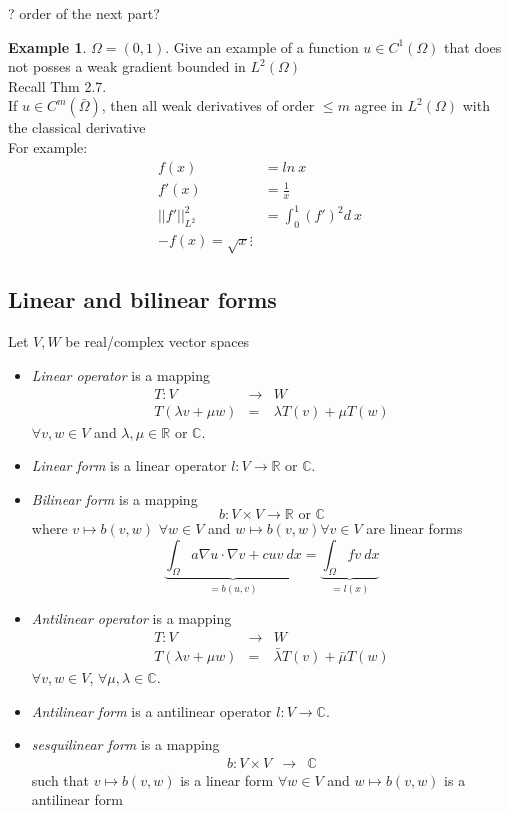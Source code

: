 \documentclass[english]{article}
\theoremstyle{definition}
\newtheorem*{exa}{Example}
\theoremstyle{remark}
\newcommand{\f}[2]{\frac{#1}{#2}}							%
\newcommand{\OO}{\Omega}
\begin{document}
? order of the next part?
\begin{exa} 
  $\OO= (0,1).$ Give an example of a function $u \in C^1(\OO)$ that does not posses a weak gradient bounded in $L^2(\OO)$\\
  Recall Thm 2.7.\\
  If $u \in C^m(\bar\OO)$, then all weak derivatives of order $\leq m$ agree in $L^2(\OO)$ with the classical derivative\\
  For example:
  \begin{align*}
    f(x) &= ln\ x\\
    f'(x)&=\f{1}{x}\\
    ||f'||_{L^2}^2&= \int_0 ^1 (f')^2 d\ x\\
    -f(x) = \sqrt{x}
    \vdots
  \end{align*}
\end{exa}
\subsection{Linear and bilinear forms}
Let $V,W$ be real/complex vector spaces
\begin{itemize}
\item {}\emph{Linear operator} is a mapping
  \begin{eqnarray*}
    T:V & \to & W\\
    T\left(\lambda v+\mu w\right) & = & \lambda T\left(v\right)+\mu T\left(w\right)
  \end{eqnarray*}
  $\forall v,w\in V$ and $\lambda,\mu\in\mathbb{R}$ or $\mathbb{C}$.
\item {}\emph{Linear form} is a linear operator $l:V\to\mathbb{R}$
  or $\mathbb{C}$.
\item {}\emph{Bilinear form} is a mapping
  \[
  b:V\times V\to\mathbb{R}\mbox{ or }\mathbb{C}
  \]
  where $v\mapsto b\left(v,w\right)$ $\forall w\in V$ and $w\mapsto b\left(v,w\right)\forall v\in V$
  are linear forms
  \[
  \underset{=b\left(u,v\right)}{\underbrace{\int_{\Omega}a\nabla u\cdot\nabla v+cuv\ dx}}=\underset{=l\left(x\right)}{\underbrace{\int_{\Omega}fv\ dx}}
  \]

\item {}\emph{Antilinear operator} is a mapping
  \begin{eqnarray*}
    T:V & \to & W\\
    T\left(\lambda v+\mu w\right) & = & \bar{\lambda}T\left(v\right)+\bar{\mu}T\left(w\right)
  \end{eqnarray*}
  $\forall v,w\in V$, $\forall\mu,\lambda\in\mathbb{C}$.
\item {}\emph{Antilinear form} is a antilinear operator
  $l:V\to\mathbb{C}$.
\item {}\emph{sesquilinear form} is a mapping
  \begin{eqnarray*}
    b:V\times V & \to & \mathbb{C}
  \end{eqnarray*}
  such that $v\mapsto b\left(v,w\right)$ is a linear form $\forall w\in V$
  and $w\mapsto b\left(v,w\right)$ is a antilinear form
\end{itemize}
\end{document}
